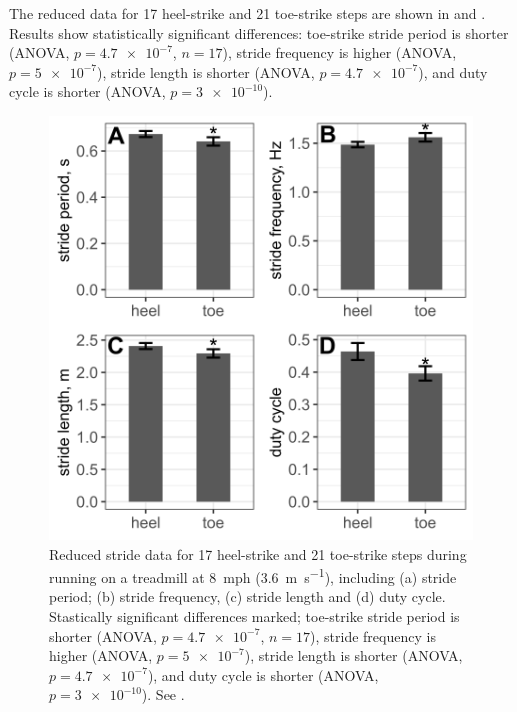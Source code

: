 The reduced data for 17 heel-strike and 21 toe-strike steps are shown in  and . Results show statistically significant differences: toe-strike stride period is shorter (ANOVA, $p=\num{4.7e-7}$, $n=17$), stride frequency is higher (ANOVA, $p=\num{5e-7}$), stride length is shorter (ANOVA, $p=\num{4.7e-7}$), and duty cycle is shorter (ANOVA, $p=\num{3e-10}$).
\begin{figure}
\begin{center}
\includegraphics{figures/stride-data.png}
\end{center}
\caption{Reduced stride data for 17 heel-strike and 21 toe-strike steps during running on a treadmill at \SI{8}{mph} (\SI{3.6}{\meter\per\second}), including (a) stride period; (b) stride frequency, (c) stride length and (d) duty cycle. Stastically significant differences marked; toe-strike stride period is shorter (ANOVA, $p=\num{4.7e-7}$, $n=17$), stride frequency is higher (ANOVA, $p=\num{5e-7}$), stride length is shorter (ANOVA, $p=\num{4.7e-7}$), and duty cycle is shorter (ANOVA, $p=\num{3e-10}$). See .} 
\label{fig:results:stride}
\end{figure}


